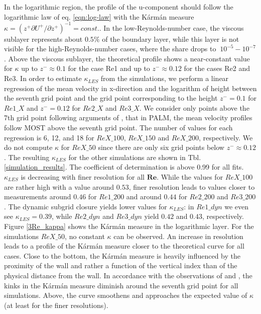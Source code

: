 \documentclass[draft,a4paper,11pt]{article}
\newcommand{\RE}{\mathbf{Re}}
\begin{document}
In the logarithmic region, the profile of the u-component should follow the logarithmic law of eq. \ref{eqn:log-law} with the K\'arm\'an measure $\kappa = (z^+\partial U^+/\partial z^+)^{-1}=const.$. In the low-Reynolds-number case, the viscous sublayer represents about $0.5\%$ of the boundary layer, while this layer is not visible for the high-Reynolds-number cases, where the share drops to $~10^{-5}-10^{-7}$. Above the viscous sublayer, the theoretical profile shows a near-constant value for $\kappa$ up to $z^-\approx0.1$ for the case Re1 and up to $z^-\approx0.12$ for the cases Re2 and Re3. In order to estimate $\kappa_{LES}$ from the simulations, we perform a linear regression of the mean velocity in x-direction and the logarithm of height between the seventh grid point and the grid point corresponding to the height $z^-=0.1$ for $Re1\_X$ and $z^-=0.12$ for $Re2\_X$ and $Re3\_X$. We consider only points above the 7th grid point following arguments of \cite{maronga2020improved}, that in PALM, the mean velocity profiles follow MOST above the seventh grid point. The number of values for each regression is 6, 12, and 18 for $ReX\_100$, $ReX\_150$ and $ReX\_200$, respectively.  We do not compute $\kappa$ for $ReX\_50$ since there are only six grid points below $z^-\approx 0.12$. The resulting $\kappa_{LES}$ for the other simulations are shown in Tbl. \ref{simulation_results}. The coefficient of determination is above 0.99 for all fits. $\kappa_{LES}$ is decreasing with finer resolution for all $\RE$. While the values for $ReX\_100$ are rather high with a value around $0.53$, finer resolution leads to values closer to measurements around $0.46$ for $Re1\_200$ and around $0.44$ for $Re2\_200$ and $Re3\_200$. The dynamic subgrid closure yields lower values for $\kappa_{LES}$: in $Re1\_dyn$ we even see $\kappa_{LES}=0.39$, while $Re2\_dyn$ and $Re3\_dyn$ yield $0.42$ and $0.43$, respectively. Figure \ref{3Re_kappa} shows the K\'arm\'an measure in the logarithmic layer. For the simulations $ReX\_50$, no constant $\kappa$ can be observed. An increase in resolution leads to a profile of the K\'arm\'an measure closer to the theoretical curve for all cases. Close to the bottom, the K\'arm\'an measure is heavily influenced by the proximity of the wall and rather a function of the vertical index than of the physical distance from the wall. In accordance with the observations of \cite{maronga2014monin} and \cite{maronga2017formulation}, the kinks in the K\'arm\'an measure diminish around the seventh grid point for all simulations. Above, the curve smoothens and approaches the expected value of $\kappa$ (at least for the finer resolutions).  
\end{document}
